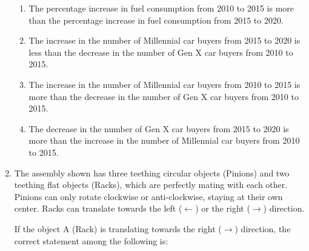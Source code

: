 \documentclass[journal]{IEEEtran}
\numberwithin{equation}{enumi}
\numberwithin{figure}{enumi}
\begin{document}
\begin{enumerate}
    \begin{enumerate}
        \item The percentage increase in fuel consumption from 2010 to 2015 is more than the percentage increase in fuel consumption from 2015 to 2020.
        \item The increase in the number of Millennial car buyers from 2015 to 2020 is less than the decrease in the number of Gen X car buyers from 2010 to 2015.
        \item The increase in the number of Millennial car buyers from 2010 to 2015 is more than the decrease in the number of Gen X car buyers from 2010 to 2015.
        \item The decrease in the number of Gen X car buyers from 2015 to 2020 is more than the increase in the number of Millennial car buyers from 2010 to 2015.
    \end{enumerate}
    \item The assembly shown has three teething circular objects (Pinions) and two teething flat objects (Racks), which are perfectly mating with each other. Pinions can only rotate clockwise or anti-clockwise, staying at their own center. Racks can translate towards the left ($\leftarrow$) or the right ($\rightarrow$) direction.

    If the object A (Rack) is translating towards the right ($\rightarrow$) direction, the correct statement among the following is:


\end{enumerate}
\end{document}
